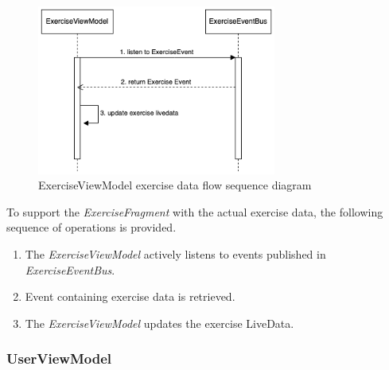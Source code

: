 \begin{figure}[H]
    \centering
    \includegraphics[width=0.7\textwidth]{diagrams/exercise-view-model-seq.drawio.png}
    \caption{ExerciseViewModel exercise data flow sequence diagram}
    \label{fig:exerciseviewmodel_exercisedata}
\end{figure}
To support the \emph{ExerciseFragment} with the actual exercise data, the following sequence of operations is provided.
\begin{enumerate}
    \item The \emph{ExerciseViewModel} actively listens to events published in \emph{ExerciseEventBus}.
    \item Event containing exercise data is retrieved.
    \item The \emph{ExerciseViewModel} updates the exercise LiveData.
\end{enumerate}

\subsubsection{UserViewModel}

